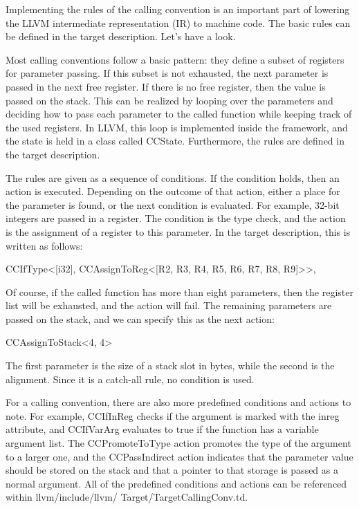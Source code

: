 
Implementing the rules of the calling convention is an important part of lowering the LLVM intermediate representation (IR) to machine code. The basic rules can be defined in the target description. Let’s have a look.

Most calling conventions follow a basic pattern: they define a subset of registers for parameter passing. If this subset is not exhausted, the next parameter is passed in the next free register. If there is no free register, then the value is passed on the stack. This can be realized by looping over the parameters and deciding how to pass each parameter to the called function while keeping track of the used registers. In LLVM, this loop is implemented inside the framework, and the state is held in a class called CCState. Furthermore, the rules are defined in the target description.

The rules are given as a sequence of conditions. If the condition holds, then an action is executed. Depending on the outcome of that action, either a place for the parameter is found, or the next condition is evaluated. For example, 32-bit integers are passed in a register. The condition is the type check, and the action is the assignment of a register to this parameter. In the target description, this is written as follows:

\begin{shell}
CCIfType<[i32],
        CCAssignToReg<[R2, R3, R4, R5, R6, R7, R8, R9]>>,
\end{shell}

Of course, if the called function has more than eight parameters, then the register list will be exhausted, and the action will fail. The remaining parameters are passed on the stack, and we can specify this as the next action:

\begin{shell}
CCAssignToStack<4, 4>
\end{shell}

The first parameter is the size of a stack slot in bytes, while the second is the alignment. Since it is a catch-all rule, no condition is used.


For a calling convention, there are also more predefined conditions and actions to note. For example, CCIfInReg checks if the argument is marked with the inreg attribute, and CCIfVarArg evaluates to true if the function has a variable argument list. The CCPromoteToType action promotes the type of the argument to a larger one, and the CCPassIndirect action indicates that the parameter value should be stored on the stack and that a pointer to that storage is passed as a normal argument. All of the predefined conditions and actions can be referenced within llvm/include/llvm/ Target/TargetCallingConv.td.

